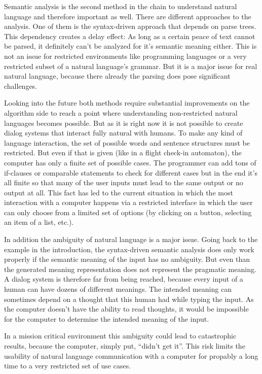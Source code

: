 \documentclass[12pt,twoside]{scrartcl}
\theoremstyle{plain}
\theoremstyle{definition}
\theoremstyle{remark}
\begin{document}
	Semantic analysis is the second method in the chain to understand natural language and therefore important as well. There are different approaches to the analysis. One of them is the syntax-driven approach that depends on parse trees. This dependency creates a delay effect: As long as a certain peace of text cannot be parsed, it definitely can't be analyzed for it's semantic meaning either. This is not an issue for restricted environments like programming languages or a very restricted subset of a natural language's grammar. But it is a major issue for real natural language, because there already the parsing does pose significant challenges.
	
	Looking into the future both methods require substantial improvements on the algorithm side to reach a point where understanding non-restricted natural languages becomes possible. But as it is right now it is not possible to create dialog systems that interact fully natural with humans. To make any kind of language interaction, the set of possible words and sentence structures must be restricted. But even if that is given (like in a flight check-in automaton), the computer has only a finite set of possible cases. The programmer can add tons of if-clauses or comparable statements to check for different cases but in the end it's all finite so that many of the user inputs must lead to the same output or no output at all. This fact has led to the current situation in which the most interaction with a computer happens via a restricted interface in which the user can only choose from a limited set of options (by clicking on a button, selecting an item of a list, etc.).
	
	
	In addition the ambiguity of natural language is a major issue. Going back to the example in the introduction, the syntax-driven semantic analysis	does only work properly if the semantic meaning of the input has no ambiguity. But even than the generated meaning representation does not represent the pragmatic meaning. A dialog system is therefore far from being reached, because every input of a human can have dozens of different meanings. The intended meaning can sometimes depend on a thought that this human had while typing the input. As the computer doesn't have the ability to read thoughts, it would be impossible for the computer to determine the intended meaning of the input.
	
	In a mission critical environment this ambiguity could lead to catastrophic results, because the computer, simply put, ``didn't get it''. This risk limits the usability of natural language communication with a computer for propably a long time to a very restricted set of use cases.
	
%
%
\clearpage


\end{document}
